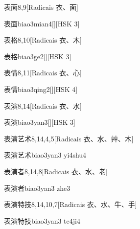 \begin{entry}{表面}{8,9}[Radicais ⾐、⾯]
  \begin{phonetics}{表面}{biao3mian4}[][HSK 3]
  \end{phonetics}
\end{entry}

\begin{entry}{表格}{8,10}[Radicais ⾐、⽊]
  \begin{phonetics}{表格}{biao3ge2}[][HSK 3]
  \end{phonetics}
\end{entry}

\begin{entry}{表情}{8,11}[Radicais ⾐、⼼]
  \begin{phonetics}{表情}{biao3qing2}[][HSK 4]
  \end{phonetics}
\end{entry}

\begin{entry}{表演}{8,14}[Radicais ⾐、⽔]
  \begin{phonetics}{表演}{biao3yan3}[][HSK 3]
  \end{phonetics}
\end{entry}

\begin{entry}{表演艺术}{8,14,4,5}[Radicais ⾐、⽔、⾋、⽊]
  \begin{phonetics}{表演艺术}{biao3yan3 yi4shu4}
  \end{phonetics}
\end{entry}

\begin{entry}{表演者}{8,14,8}[Radicais ⾐、⽔、⽼]
  \begin{phonetics}{表演者}{biao3yan3 zhe3}
  \end{phonetics}
\end{entry}

\begin{entry}{表演特技}{8,14,10,7}[Radicais ⾐、⽔、⽜、⼿]
  \begin{phonetics}{表演特技}{biao3yan3 te4ji4}
  \end{phonetics}
\end{entry}

